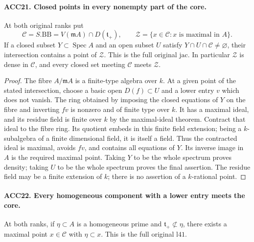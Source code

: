 \paragraph{ACC21. Closed points in every nonempty part of the core.}
\label{claim:ACC21}
At both original ranks put
\[
 \mathcal C=S.\mathrm{BB}
   =V(\mathfrak m A)\cap D(\mathfrak t_+),\qquad
 \mathcal Z=\{x\in\mathcal C:x\text{ is maximal in }A\}.
                                                               \tag{ACC.28}
\]
If a closed subset \(Y\subset\operatorname{Spec}A\) and an
open subset \(U\) satisfy \(Y\cap U\cap\mathcal C\ne\varnothing\),
their intersection contains a point of \(\mathcal Z\).
This is the full original \(\mathrm{jac}\).  In particular
\(\mathcal Z\) is dense in \(\mathcal C\), and every closed
set meeting \(\mathcal C\) meets \(\mathcal Z\).

\begin{proof}
The fibre \(A/\mathfrak m A\) is a finite-type algebra over
\(k\).  At a given point of the stated intersection, choose a
basic open \(D(f)\subset U\) and a lower entry \(v\) which
does not vanish.  The ring obtained by imposing the closed equations
of \(Y\) on the fibre and inverting \(fv\) is nonzero and
of finite type over \(k\).  It has a maximal ideal, and its
residue field is finite over \(k\) by the maximal-ideal theorem.
Contract that ideal to the fibre ring.  Its quotient embeds in this
finite field extension; being a \(k\)-subalgebra of a finite
dimensional field, it is itself a field.  Thus the contracted ideal
is maximal, avoids \(fv\), and contains all equations of \(Y\).
Its inverse image in \(A\) is the required maximal point.
Taking \(Y\) to be the whole spectrum proves density; taking
\(U\) to be the whole spectrum proves the final assertion.
The residue field may be a finite extension of \(k\); there is
no assertion of a \(k\)-rational point.
\end{proof}

\paragraph{ACC22. Every homogeneous component with a lower entry meets the core.}
\label{claim:ACC22}
At both ranks, if \(\eta\subset A\) is a homogeneous prime
and \(\mathfrak t_+\not\subset\eta\), there exists a maximal
point \(x\in\mathcal C\) with \(\eta\subset x\).
This is the full original \(\mathrm{l41}\).

